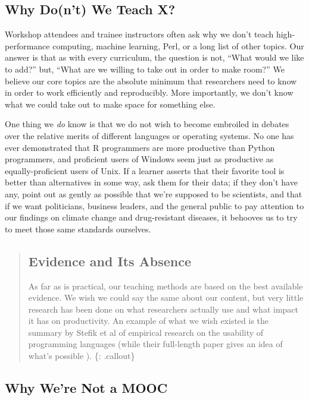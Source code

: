 \subsection{Why Do(n't) We Teach X?}\label{why-dont-we-teach-x}

Workshop attendees and trainee instructors often ask why we don't teach
high-performance computing, machine learning, Perl, or a long list of
other topics. Our answer is that as with every curriculum, the question
is not, ``What would we like to add?'' but, ``What are we willing to
take out in order to make room?'' We believe our core topics are the
absolute minimum that researchers need to know in order to work
efficiently and reproducibly. More importantly, we don't know what we
could take out to make space for something else.

One thing we \emph{do} know is that we do not wish to become embroiled
in debates over the relative merits of different languages or operating
systems. No one has ever demonstrated that R programmers are more
productive than Python programmers, and proficient users of Windows seem
just as productive as equally-proficient users of Unix. If a learner
asserts that their favorite tool is better than alternatives in some
way, ask them for their data; if they don't have any, point out as
gently as possible that we're supposed to be scientists, and that if we
want politicians, business leaders, and the general public to pay
attention to our findings on climate change and drug-resistant diseases,
it behooves us to try to meet those same standards ourselves.

\begin{quote}
\subsection{Evidence and Its Absence}\label{evidence-and-its-absence}

As far as is practical, our teaching methods are based on the best
available evidence. We wish we could say the same about our content, but
very little research has been done on what researchers actually use and
what impact it has on productivity. An example of what we wish existed
is the summary by Stefik et al of empirical research on the usability of
programming languages \cite{bib:stefik-summary}
(while
their  full-length paper gives an idea of what's possible \cite{bib:stefik-fixme}).
\{: .callout\}
\end{quote}

\subsection{Why We're Not a MOOC}\label{why-were-not-a-mooc}

